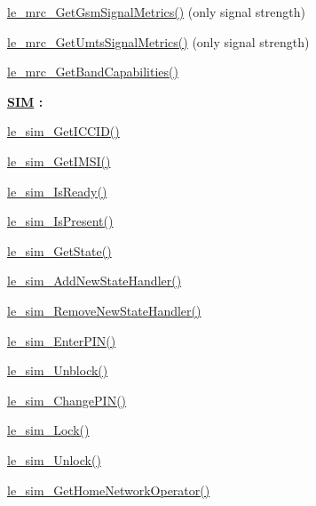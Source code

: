 \begin{DoxyItemize}
\item \hyperlink{le__mrc__interface_8h_a9d7243b29bf4c705c4eba83fa3799582}{le\+\_\+mrc\+\_\+\+Get\+Gsm\+Signal\+Metrics()} (only signal strength)
\item \hyperlink{le__mrc__interface_8h_a456648564abfc8e9711b60a5d8bddc9b}{le\+\_\+mrc\+\_\+\+Get\+Umts\+Signal\+Metrics()} (only signal strength)
\item \hyperlink{le__mrc__interface_8h_a7cb0a206729c652692701cd24226d34f}{le\+\_\+mrc\+\_\+\+Get\+Band\+Capabilities()}
\end{DoxyItemize}

{\bfseries \hyperlink{c_sim}{S\+IM} \+:}
\begin{DoxyItemize}
\item \hyperlink{le__sim__interface_8h_a7b43e4e8713af665657e15ae0f5bc1e8}{le\+\_\+sim\+\_\+\+Get\+I\+C\+C\+I\+D()}
\item \hyperlink{le__sim__interface_8h_acc0f801f268630ea496377077a366374}{le\+\_\+sim\+\_\+\+Get\+I\+M\+S\+I()}
\item \hyperlink{le__sim__interface_8h_ace457890856d3692ecb4176f0e892558}{le\+\_\+sim\+\_\+\+Is\+Ready()}
\item \hyperlink{le__sim__interface_8h_aa3255a29cec4358c5e0d68b9ac62ff88}{le\+\_\+sim\+\_\+\+Is\+Present()}
\item \hyperlink{le__sim__interface_8h_a16b06f266471d81f772e5439ec570144}{le\+\_\+sim\+\_\+\+Get\+State()}
\item \hyperlink{le__sim__interface_8h_a8e296a7cd35edd99cb1dc21232e280dd}{le\+\_\+sim\+\_\+\+Add\+New\+State\+Handler()}
\item \hyperlink{le__sim__interface_8h_a0286578e9aa46ba864df1878263b9f84}{le\+\_\+sim\+\_\+\+Remove\+New\+State\+Handler()}
\item \hyperlink{le__sim__interface_8h_ac9cafacb5affb0b531534e3fc547ebd2}{le\+\_\+sim\+\_\+\+Enter\+P\+I\+N()}
\item \hyperlink{le__sim__interface_8h_a234634c9789cdbc8f76629a2272bd2dd}{le\+\_\+sim\+\_\+\+Unblock()}
\item \hyperlink{le__sim__interface_8h_a50b6ce8bae5a073307d1d12550b22c1e}{le\+\_\+sim\+\_\+\+Change\+P\+I\+N()}
\item \hyperlink{le__sim__interface_8h_a6fab9b258f5af39645b9a200ed202a27}{le\+\_\+sim\+\_\+\+Lock()}
\item \hyperlink{le__sim__interface_8h_a4397d51c42ba894f0fa4206341a0dc64}{le\+\_\+sim\+\_\+\+Unlock()}
\item \hyperlink{le__sim__interface_8h_a2fa95e7fdaaff2fd000e676b9cc34344}{le\+\_\+sim\+\_\+\+Get\+Home\+Network\+Operator()}
\end{DoxyItemize}


